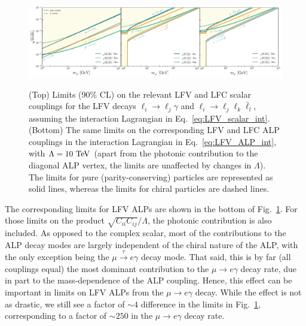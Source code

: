 {\begin{figure}[t!]
    \centering
    \includegraphics[width=\linewidth]{figures/chapter3/lfv_scalar_lepton_decay_limits.pdf}\\
    \caption[Constraints on LFV scalar and ALP couplings from LFV lepton decay limits.]{(Top) Limits (90\% CL) on the relevant LFV and LFC scalar couplings for the LFV decays $\ell_i \rightarrow \ell_j \gamma$ and $\ell_i\rightarrow\ell_j\ell_k\bar{\ell}_l$, assuming the interaction Lagrangian in Eq.~\ref{eq:LFV_scalar_int}. (Bottom) The same limits on the corresponding LFV and LFC ALP couplings in the interaction Lagrangian in Eq.~\ref{eq:LFV_ALP_int}, with $\Lambda = 10~{\rm TeV}$ (apart from the photonic contribution to the diagonal ALP vertex, the limits are unaffected by changes in $\Lambda$). The limits for pure (parity-conserving) particles are represented as solid lines, whereas the limits for chiral particles are dashed lines. }
    \label{fig:LFV_limits}
\end{figure}

The corresponding limits for LFV ALPs are shown in the bottom of Fig.~\ref{fig:LFV_limits}. For those limits on the product $\sqrt{C_{ii}C_{ij}}/\Lambda$, the photonic contribution is also included. As opposed to the complex scalar, most of the contributions to the ALP decay modes are largely independent of the chiral nature of the ALP, with the only exception being the $\mu \overset{\tau}{\longrightarrow} e\gamma$ decay mode. That said, this is by far (all couplings equal) the most dominant contribution to the $\mu\rightarrow e\gamma$ decay rate, due in part to the mass-dependence of the ALP coupling. Hence, this effect can be important in limits on LFV ALPs from the $\mu\rightarrow e\gamma$ decay. While the effect is not as drastic, we still see a factor of $\sim 4$ difference in the limits in Fig.~\ref{fig:LFV_limits}, corresponding to a factor of $\sim 250$ in the $\mu \rightarrow e\gamma$ decay rate.

}

